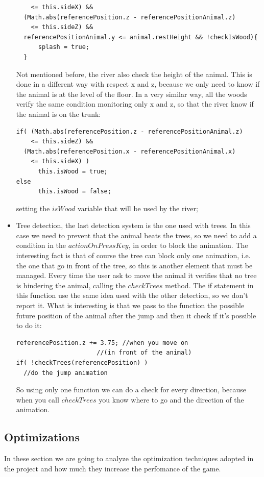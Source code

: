 \documentclass[a4paper, 11pt]{article}
\begin{document}
\begin{itemize}
\begin{lstlisting}
    <= this.sideX) &&
  (Math.abs(referencePosition.z - referencePositionAnimal.z) 
    <= this.sideZ) &&
  referencePositionAnimal.y <= animal.restHeight && !checkIsWood){
      splash = true;
  }
  \end{lstlisting}
  Not mentioned before, the river also check the height of the animal. This is done in a different way with respect x and z, because we only need to know if the animal is at the level of the floor. In a very similar way, all the woods verify the same condition monitoring only x and z, so that the river know if the animal is on the trunk:
  \begin{lstlisting}
if( (Math.abs(referencePosition.z - referencePositionAnimal.z) 
    <= this.sideZ) &&
  (Math.abs(referencePosition.x - referencePositionAnimal.x) 
    <= this.sideX) )
      this.isWood = true;
else 
      this.isWood = false;
  \end{lstlisting}
  setting the $isWood$ variable that will be used by the river; 
  \item Tree detection, the last detection system is the one used with trees. In this case we need to prevent that the animal beats the trees, so we need to add a condition in the $actionOnPressKey$, in order to block the animation. The interesting fact is that of course the tree can block only one animation, i.e. the one that go in front of the tree, so this is another element that must be managed. Every time the user ask to move the animal it verifies that no tree is hindering the animal, calling the $checkTrees$ method. The if statement in this function use the same idea used with the other detection, so we don't report it. What is interesting is that we pass to the function the possible future position of the animal after the jump and then it check if it's possible to do it:
  \begin{lstlisting}
referencePosition.z += 3.75; //when you move on 
                      //(in front of the animal)
if( !checkTrees(referencePosition) )
  //do the jump animation
  \end{lstlisting}
  So using only one function we can do a check for every direction, because when you call $checkTrees$ you know where to go and the direction of the animation.
\end{itemize}
\subsection{Optimizations}
%
In these section we are going to analyze the optimization techniques adopted in the project and how much they increase the perfomance of the game. \\
\end{document}
